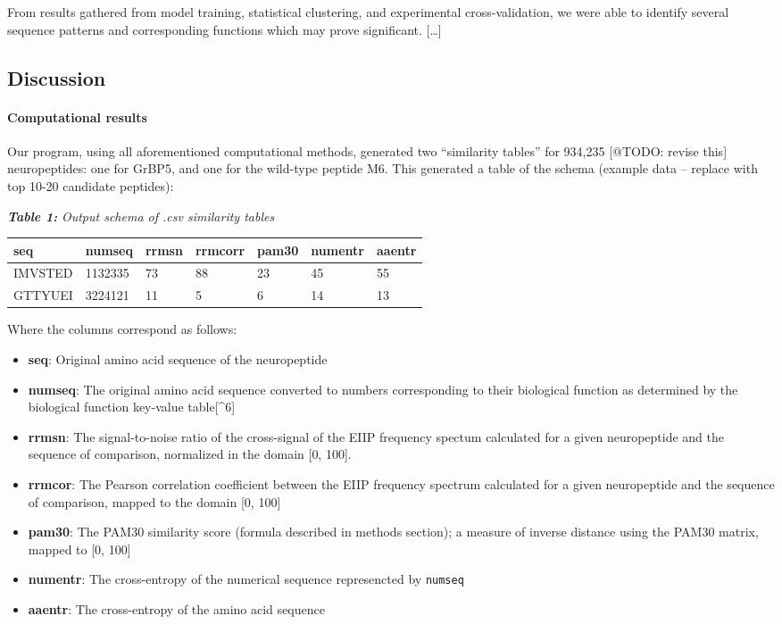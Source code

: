 \documentclass[]{article}
\providecommand{\tightlist}{%
  \setlength{\itemsep}{0pt}\setlength{\parskip}{0pt}}
\let\oldparagraph\paragraph
\renewcommand{\paragraph}[1]{\oldparagraph{#1}\mbox{}}
\begin{document}
From results gathered from model training, statistical clustering, and
experimental cross-validation, we were able to identify several sequence
patterns and corresponding functions which may prove significant.
{[}\ldots{}{]}

\hypertarget{discussion}{%
\subsection{Discussion}\label{discussion}}

\hypertarget{computational-results}{%
\paragraph{Computational results}\label{computational-results}}

Our program, using all aforementioned computational methods, generated
two ``similarity tables'' for 934,235 {[}@TODO: revise this{]}
neuropeptides: one for GrBP5, and one for the wild-type peptide M6. This
generated a table of the schema (example data -- replace with top 10-20
candidate peptides):

\textbf{\emph{Table 1:}} \emph{Output schema of .csv similarity tables}

\begin{longtable}[]{@{}lllllll@{}}
\toprule
\textbf{seq} & numseq & rrmsn & rrmcorr & pam30 & numentr &
aaentr\tabularnewline
\midrule
\endhead
IMVSTED & 1132335 & 73 & 88 & 23 & 45 & 55\tabularnewline
GTTYUEI & 3224121 & 11 & 5 & 6 & 14 & 13\tabularnewline
\bottomrule
\end{longtable}

Where the columns correspond as follows:

\begin{itemize}
\tightlist
\item
  \textbf{seq}: Original amino acid sequence of the neuropeptide
\item
  \textbf{numseq}: The original amino acid sequence converted to numbers
  corresponding to their biological function as determined by the
  biological function key-value table{[}\^{}6{]}
\item
  \textbf{rrmsn}: The signal-to-noise ratio of the cross-signal of the
  EIIP frequency spectum calculated for a given neuropeptide and the
  sequence of comparison, normalized in the domain {[}0, 100{]}.
\item
  \textbf{rrmcor}: The Pearson correlation coefficient between the EIIP
  frequency spectrum calculated for a given neuropeptide and the
  sequence of comparison, mapped to the domain {[}0, 100{]}
\item
  \textbf{pam30}: The PAM30 similarity score (formula described in
  methods section); a measure of inverse distance using the PAM30
  matrix, mapped to {[}0, 100{]}
\item
  \textbf{numentr}: The cross-entropy of the numerical sequence
  represencted by \texttt{numseq}
\item
  \textbf{aaentr}: The cross-entropy of the amino acid sequence
\end{itemize}
\end{document}
